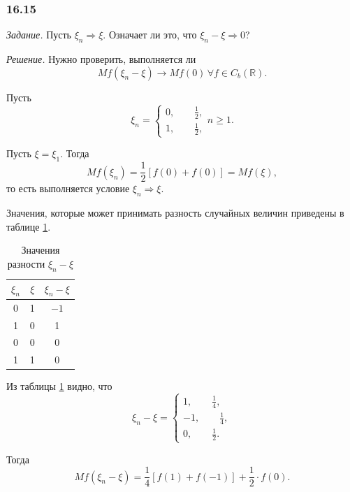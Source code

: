 \subsubsection*{16.15}

\textit{Задание.} Пусть $ \xi_n \Rightarrow \xi $.
Означает ли это, что $ \xi_n - \xi \Rightarrow 0$?

\textit{Решение.} Нужно проверить, выполняется ли
$$Mf \left( \xi_n - \xi \right) \rightarrow Mf \left( 0 \right) \,
\forall f \in C_b \left( \mathbb{R} \right).$$

Пусть
$$ \xi_n =
\begin{cases}
0, \qquad \frac{1}{2}, \\
1, \qquad \frac{1}{2},
\end{cases}
n \geq 1.$$

Пусть $ \xi = \xi_1$.
Тогда
$$Mf \left( \xi_n \right) =
\frac{1}{2} \left[ f \left( 0 \right) + f \left( 0 \right) \right] =
Mf \left( \xi \right),$$
то есть выполняется условие $ \xi_n \Rightarrow \xi $.

Значения, которые может принимать разность случайных величин приведены в таблице
\ref{table:difference}.

\begin{table}
\begin{center}
  \begin{tabular}{ | c | c | c | }
    \hline
    $ \xi_n$ & $ \xi $ & $ \xi_n - \xi $ \\ \hline
    0 & 1 & $-1$ \\ \hline
    1 & 0 & 1 \\ \hline
    0 & 0 & 0 \\ \hline
    1 & 1 & 0 \\
    \hline
  \end{tabular}
\caption{Значения разности $ \xi_n - \xi $ \label{table:difference}}
\end{center}
\end{table}

Из таблицы \ref{table:difference} видно, что
$$ \xi_n - \xi =
\begin{cases}
1, \qquad \frac{1}{4}, \\
-1, \qquad \frac{1}{4}, \\
0, \qquad \frac{1}{2}.
\end{cases}$$

Тогда
$$Mf \left( \xi_n - \xi \right) =
\frac{1}{4} \left[ f \left( 1 \right) +
f \left( -1 \right) \right] + \frac{1}{2} \cdot f \left( 0 \right).$$

